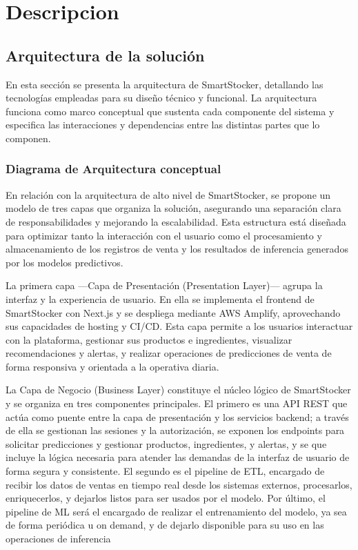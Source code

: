 \chapter{Descripcion}\label{chapter04}
\section{Arquitectura de la solución}\label{sec:arquitectura-solucion}
En esta sección se presenta la arquitectura de SmartStocker, detallando las tecnologías empleadas para su diseño técnico y funcional. La arquitectura funciona como marco conceptual que sustenta cada componente del sistema y especifica las interacciones y dependencias entre las distintas partes que lo componen.

\subsection{Diagrama de Arquitectura conceptual}\label{sec:arquitectura-conceptual}
En relación con la arquitectura de alto nivel de SmartStocker, se propone un modelo de tres capas que organiza la solución, asegurando una separación clara de responsabilidades y mejorando la escalabilidad. Esta estructura está diseñada para optimizar tanto la interacción con el usuario como el procesamiento y almacenamiento de los registros de venta y los resultados de inferencia generados por los modelos predictivos.

La primera capa —Capa de Presentación (Presentation Layer)— agrupa la interfaz y la experiencia de usuario. En ella se implementa el frontend de SmartStocker con Next.js y se despliega mediante AWS Amplify, aprovechando sus capacidades de hosting y CI/CD. Esta capa permite a los usuarios interactuar con la plataforma, gestionar sus productos e ingredientes, visualizar recomendaciones y alertas, y realizar operaciones de predicciones de venta de forma responsiva y orientada a la operativa diaria.

La Capa de Negocio (Business Layer) constituye el núcleo lógico de SmartStocker y se organiza en tres componentes principales. El primero es una API REST que actúa como puente entre la capa de presentación y los servicios backend; a través de ella se gestionan las sesiones y la autorización, se exponen los endpoints para solicitar predicciones y gestionar productos, ingredientes, y alertas, y se que incluye la lógica necesaria para atender las demandas de la interfaz de usuario de forma segura y consistente. El segundo es el pipeline de ETL, encargado de recibir los datos de ventas en tiempo real desde los sistemas externos, procesarlos, enriquecerlos, y dejarlos listos para ser usados por el modelo. Por último, el pipeline de ML será el encargado de realizar el entrenamiento del modelo, ya sea de forma periódica u on demand, y de dejarlo disponible para su uso en las operaciones de inferencia 


